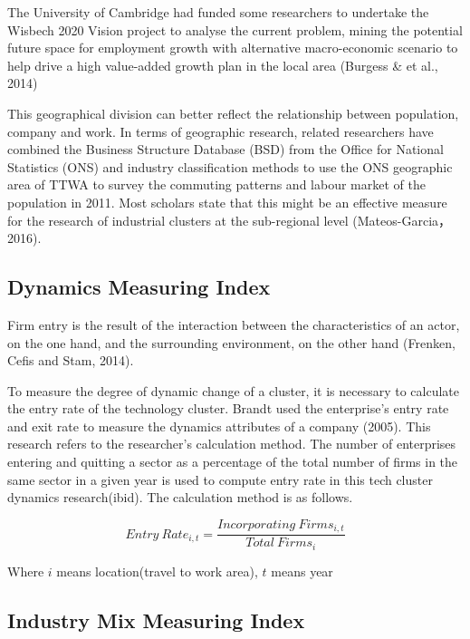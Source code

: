 \documentclass[
  12pt,
  oneside]{book}
\begin{document}
The University of Cambridge had funded some researchers to undertake the Wisbech 2020 Vision project to analyse the current problem, mining the potential future space for employment growth with alternative macro-economic scenario to help drive a high value-added growth plan in the local area (Burgess \& et al., 2014)

This geographical division can better reflect the relationship between population, company and work. In terms of geographic research, related researchers have combined the Business Structure Database (BSD) from the Office for National Statistics (ONS) and industry classification methods to use the ONS geographic area of TTWA to survey the commuting patterns and labour market of the population in 2011. Most scholars state that this might be an effective measure for the research of industrial clusters at the sub-regional level (Mateos-Garcia，2016).

\hypertarget{dynamics-measuring-index}{%
\subsection{Dynamics Measuring Index}\label{dynamics-measuring-index}}

Firm entry is the result of the interaction between the
characteristics of an actor, on the one hand, and the surrounding environment, on the other hand (Frenken, Cefis and Stam, 2014).

To measure the degree of dynamic change of a cluster, it is necessary to calculate the entry rate of the technology cluster. Brandt used the enterprise's entry rate and exit rate to measure the dynamics attributes of a company (2005). This research refers to the researcher's calculation method. The number of enterprises entering and quitting a sector as a percentage of the total number of firms in the same sector in a given year is used to compute entry rate in this tech cluster dynamics research(ibid). The calculation method is as follows.

\[ Entry\ Rate_{i,t} = \frac{Incorporating\ Firms_{i,t}}{Total\  Firms_{i}} \]

Where \(i\) means location(travel to work area), \(t\) means year

\hypertarget{industry-mix-measuring-index}{%
\subsection{Industry Mix Measuring Index}\label{industry-mix-measuring-index}}
\end{document}
